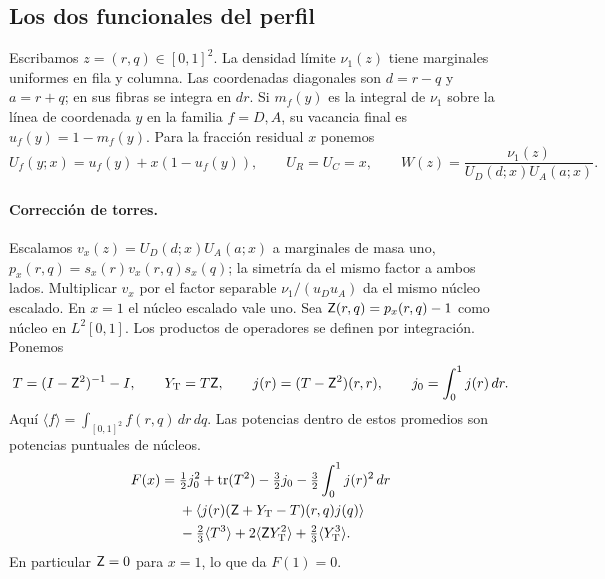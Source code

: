 \subsection{Los dos funcionales del perfil}\label{sec:profile-data}
Escribamos \(z=(r,q)\in[0,1]^2\). La densidad límite \(\nu_1(z)\) tiene marginales uniformes en fila y
columna. Las coordenadas diagonales son \(d=r-q\) y \(a=r+q\); en sus fibras se integra en \(dr\).
Si \(m_f(y)\) es la integral de \(\nu_1\) sobre la línea de coordenada \(y\) en la familia \(f=D,A\),
su vacancia final es \(u_f(y)=1-m_f(y)\). Para la fracción residual \(x\) ponemos
\[
 U_f(y;x)=u_f(y)+x(1-u_f(y)),\qquad U_R=U_C=x,\qquad
 W(z)=\frac{\nu_1(z)}{U_D(d;x)U_A(a;x)} .
\]
\paragraph{Corrección de torres.}
Escalamos \(v_x(z)=U_D(d;x)U_A(a;x)\) a marginales de masa uno,
\(p_x(r,q)=s_x(r)v_x(r,q)s_x(q)\); la simetría da el mismo factor a ambos lados.
Multiplicar \(v_x\) por el factor separable \(\nu_1/(u_Du_A)\) da el mismo núcleo escalado.
En \(x=1\) el núcleo escalado vale uno. Sea \(\mathsf Z(r,q)=p_x(r,q)-1\) como núcleo en \(L^2[0,1]\).
Los productos de operadores se definen por integración. Ponemos
\[
 T=(I-\mathsf Z^2)^{-1}-I,\qquad Y_{\rm T}=T\mathsf Z,\qquad
 j(r)=(T-\mathsf Z^2)(r,r),\qquad j_0=\int_0^1j(r)\,dr .
\]
Aquí \(\langle f\rangle=\int_{[0,1]^2} f(r,q)\,dr\,dq\).
Las potencias dentro de estos promedios son potencias puntuales de núcleos.
\begin{align}
 F(x)={}&\tfrac12 j_0^2+\operatorname{tr}(T^2)-\tfrac32j_0-\tfrac32\int_0^1 j(r)^2\,dr\notag\\
 &+\langle j(r)(\mathsf Z+Y_{\rm T}-T)(r,q)j(q)\rangle\notag\\
 &-\tfrac23\langle T^3\rangle+2\langle \mathsf Z Y_{\rm T}^2\rangle+\tfrac23\langle Y_{\rm T}^3\rangle
 .\label{eq:F-def}
\end{align}
En particular \(\mathsf Z=0\) para \(x=1\), lo que da \(F(1)=0\).
